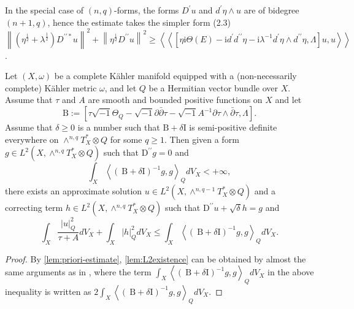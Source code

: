 \documentclass[lang=en,12pt]{beautybook}
\begin{document}
\begin{fancybox}
In the special case of $(n, q)$-forms, the forms $D^{\prime} u$ and $d^{\prime} \eta \wedge u$ are of bidegree $(n+1, q)$, hence the estimate takes the simpler form
(2.3) $\left\|\left(\eta^{\frac{1}{2}}+\lambda^{\frac{1}{2}}\right) D^{\prime \prime *} u\right\|^2+\left\|\eta^{\frac{1}{2}} D^{\prime \prime} u\right\|^2 \geqslant\left\langle\left\langle\left[\eta \mathrm{i} \Theta(E)-\mathrm{i} d^{\prime} d^{\prime \prime} \eta-\mathrm{i} \lambda^{-1} d^{\prime} \eta \wedge d^{\prime \prime} \eta, \Lambda\right] u, u\right\rangle\right\rangle$.
\end{fancybox}

\begin{lemma}
  Let $(X, \omega)$ be a complete Kähler manifold equipped with a (non-necessarily complete) Kähler metric $\omega$, and let $Q$ be a Hermitian vector bundle over $X$. Assume that $\tau$ and $A$ are smooth and bounded positive functions on $X$ and let $$\mathrm{B}:=\left[\tau \sqrt{-1} \Theta_Q-\sqrt{-1} \partial \bar{\partial} \tau-\sqrt{-1} A^{-1} \partial \tau \wedge \bar{\partial} \tau, \Lambda\right].$$ Assume that $\delta \geq 0$ is a number such that $\mathrm{B}+\delta \mathrm{I}$ is semi-positive definite everywhere on $\wedge^{n, q} T_X^* \otimes Q$ for some $q \geq 1$. Then given a form $g \in L^2\left(X, \wedge^{n, q} T_X^* \otimes Q\right)$ such that $\mathrm{D}^{\prime \prime} g=0$ and $$\int_X\left\langle(\mathrm{~B}+\delta \mathrm{I})^{-1} g, g\right\rangle_Q d V_X<+\infty,$$ there exists an approximate solution $u \in L^2\left(X, \wedge^{n, q-1} T_X^* \otimes Q\right)$ and a correcting term $h \in L^2\left(X, \wedge^{n, q} T_X^* \otimes Q\right)$ such that $\mathrm{D}^{\prime \prime} u+\sqrt{\delta} h=g$ and
$$
\int_X \frac{|u|_Q^2}{\tau+A} d V_X+\int_X|h|_Q^2 d V_X \leq \int_X\left\langle(\mathrm{~B}+\delta \mathrm{I})^{-1} g, g\right\rangle_Q d V_X .
$$
\end{lemma}

\begin{proof}
  By \autoref{lem:priori-estimate}, \autoref{lem:L2existence} can be obtained by almost the same arguments as in \cite{Demailly2000}, where the term $\int_X\left\langle(\mathrm{~B}+\delta \mathrm{I})^{-1} g, g\right\rangle_Q d V_X$ in the above inequality is written as $2 \int_X\left\langle(\mathrm{~B}+\delta \mathrm{I})^{-1} g, g\right\rangle_Q d V_X$.
\end{proof}
\end{document}

